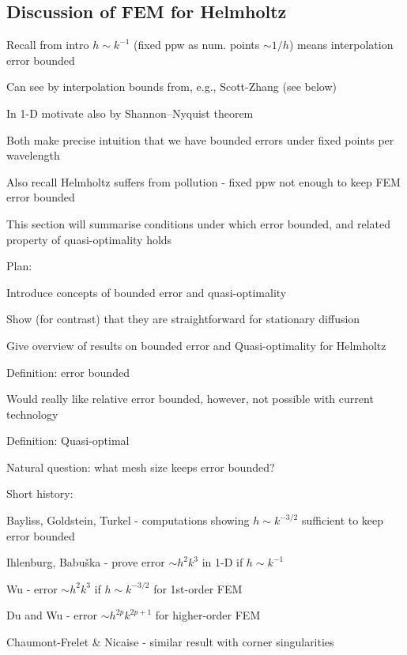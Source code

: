 \subsection{Discussion of FEM for Helmholtz}
\bit
\item Recall from intro $h\sim k^{-1}$ (fixed ppw as num. points $\sim 1/h$) means interpolation error bounded
\bit
\item Can see by interpolation bounds from, e.g., Scott-Zhang (see below)
\item In 1-D motivate also by Shannon--Nyquist theorem
\item Both make precise intuition that we have bounded errors under fixed points per wavelength
\eit
\item Also recall Helmholtz suffers from pollution - fixed ppw not enough to keep FEM error bounded
\item This section will summarise conditions under which error bounded, and related property of quasi-optimality holds
\item Plan:
\bit
\item Introduce concepts of bounded error and quasi-optimality
\item Show (for contrast) that they are straightforward for stationary diffusion
\item Give overview of results on bounded error and Quasi-optimality for Helmholtz
\eit
\eit
\bit
\item Definition: error bounded
\item Would really like relative error bounded, however, not possible with current technology
\item Definition: Quasi-optimal
\item Natural question: what mesh size keeps error bounded?
\item Short history:
\bit
\item Bayliss, Goldstein, Turkel - computations showing $h\sim k^{-3/2}$ sufficient to keep error bounded
\item Ihlenburg, Babu\v{s}ka - prove error $\sim h^2k^3$ in 1-D if $h \sim k^{-1}$
\item Wu - error $\sim h^2k^3$ if $h \sim k^{-3/2}$ for 1st-order FEM
\item Du and Wu - error $\sim h^{2p}k^{2p+1}$ for higher-order FEM
\item Chaumont-Frelet \& Nicaise - similar result with corner singularities
